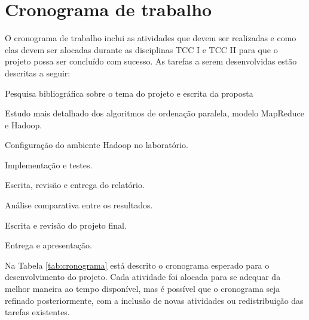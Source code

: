 \section{Cronograma de trabalho}


O cronograma de trabalho inclui as atividades que devem ser realizadas e como elas devem ser alocadas durante as disciplinas TCC I e TCC II para que o projeto possa ser concluído com sucesso.
As tarefas a serem desenvolvidas estão descritas a seguir:

\begin{num_enum}
 \item \label{c1} Pesquisa bibliográfica sobre o tema do projeto e escrita da proposta
 \item \label{c2} Estudo mais detalhado dos algoritmos de ordenação paralela,  modelo MapReduce e Hadoop.
 \item \label{c3} Configuração do ambiente Hadoop no laboratório.
 \item \label{c4} Implementação e testes.
 \item \label{c5} Escrita, revisão e entrega do relatório. 
 \item \label{c7} Análise comparativa entre os resultados.
 \item \label{c8} Escrita e revisão do projeto final.
 \item \label{c9} Entrega e apresentação.
 \end{num_enum}
 
 
Na Tabela \ref{tab:cronograma} está descrito o cronograma esperado para o desenvolvimento do projeto. Cada atividade foi alocada para se adequar da melhor maneira ao tempo disponível, mas é possível que o cronograma seja refinado posteriormente, com a inclusão de novas atividades ou redistribuição das tarefas existentes. 

